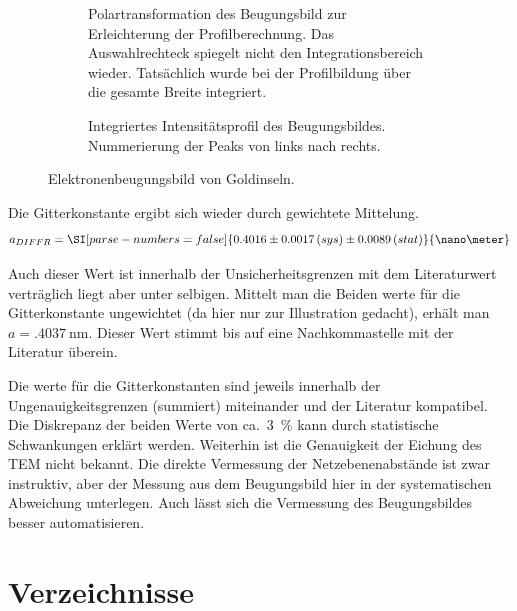 \documentclass[slug=TEM, room=IFW, supervisor=?, coursedate=23.\ 01.\ 2020]{../../Lab_Report_LaTeX/lab_report}
\begin{document}
\begin{figure}[hp]
\begin{subfigure}{.4\textwidth}
    \caption{Polartransformation des Beugungsbild zur Erleichterung
      der Profilberechnung. Das Auswahlrechteck spiegelt nicht den
      Integrationsbereich wieder. Tats\"achlich wurde bei der
      Profilbildung \"uber die gesamte Breite integriert.}%
    \label{fig:ebeug_plolar}
  \end{subfigure}
  \begin{subfigure}{\textwidth}
    \centering \resizebox{1\textwidth}{!}{%
      }
    \caption{Integriertes Intensit\"atsprofil des
      Beugungsbildes. Nummerierung der Peaks von links nach rechts.}%
    \label{fig:gold_diffr-profile}
  \end{subfigure}
  \caption{Elektronenbeugungsbild von Goldinseln.}
  \label{fig:ebeug}
\end{figure}

Die Gitterkonstante ergibt sich wieder durch gewichtete Mittelung.
\begin{equation}
  \label{eq:ahrtem}
  a_{DIFFR} = \SI[parse-numbers=false]{0.4016\pm 0.0017\,(sys)\pm 0.0089\,(stat)}{\nano\meter}
\end{equation}

Auch dieser Wert ist innerhalb der Unsicherheitsgrenzen mit dem
Literaturwert vertr\"aglich liegt aber unter selbigen. Mittelt man die
Beiden werte f\"ur die Gitterkonstante ungewichtet (da hier nur zur
Illustration gedacht), erhält man
\(a=\SI{.4037}{\nano\meter}\). Dieser Wert stimmt bis auf eine
Nachkommastelle mit der Literatur \"uberein.

Die werte f\"ur die Gitterkonstanten sind jeweils innerhalb der
Ungenauigkeitsgrenzen (summiert) miteinander und der Literatur
kompatibel. Die Diskrepanz der beiden Werte von ca.~\SI{3}{\percent}
kann durch statistische Schwankungen erkl\"art werden. Weiterhin ist
die Genauigkeit der Eichung des TEM nicht bekannt. Die direkte
Vermessung der Netzebenenabst\"ande ist zwar instruktiv, aber der
Messung aus dem Beugungsbild hier in der systematischen Abweichung
unterlegen. Auch l\"asst sich die Vermessung des Beugungsbildes besser
automatisieren.

\newpage
\section{Verzeichnisse}
\label{sec:literatur}

\listoffigures

\listoftables

\printbibliography
\end{document}

